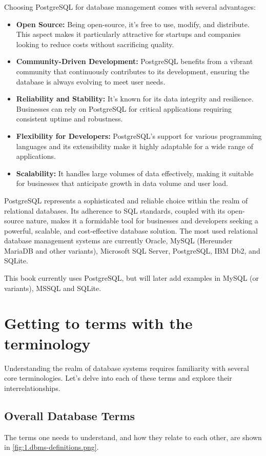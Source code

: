 Choosing PostgreSQL for database management comes with several advantages:

\begin{itemize}
    \item \textbf{Open Source:} Being open-source, it's free to use, modify, and distribute. This aspect makes it particularly attractive for startups and companies looking to reduce costs without sacrificing quality.
    \item \textbf{Community-Driven Development:} PostgreSQL benefits from a vibrant community that continuously contributes to its development, ensuring the database is always evolving to meet user needs.
    \item \textbf{Reliability and Stability:} It's known for its data integrity and resilience. Businesses can rely on PostgreSQL for critical applications requiring consistent uptime and robustness.
    \item \textbf{Flexibility for Developers:} PostgreSQL's support for various programming languages and its extensibility make it highly adaptable for a wide range of applications.
    \item \textbf{Scalability:} It handles large volumes of data effectively, making it suitable for businesses that anticipate growth in data volume and user load.
\end{itemize}

PostgreSQL represents a sophisticated and reliable choice within the realm of relational databases. Its adherence to SQL standards, coupled with its open-source nature, makes it a formidable tool for businesses and developers seeking a powerful, scalable, and cost-effective database solution. The most used relational database management systems are currently Oracle, MySQL (Hereunder MariaDB and other variants), Microsoft SQL Server, PostgreSQL, IBM Db2, and SQLite.

This book currently uses PostgreSQL, but will later add examples in MySQL (or variants), MSSQL and SQLite.


\section{Getting to terms with the terminology}
Understanding the realm of database systems requires familiarity with several core terminologies. Let's delve into each of these terms and explore their interrelationships.

\subsection{Overall Database Terms}
The terms one needs to understand, and how they relate to each other, are shown in \cref{fig:1.dbms-definitions.png}.

